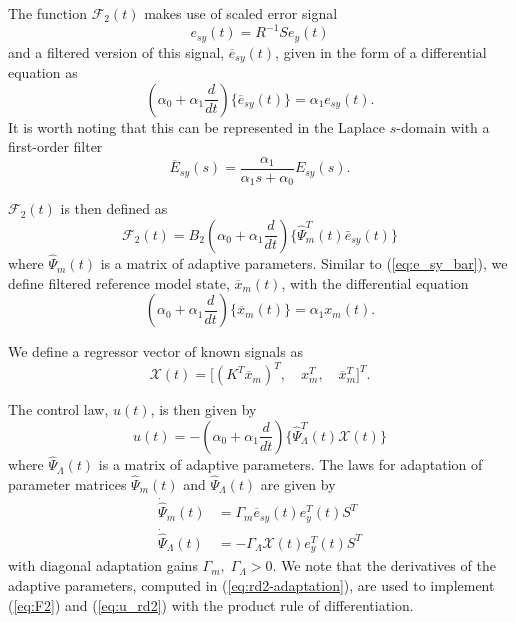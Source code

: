\documentclass[english]{ifacconf}
\begin{document}
The function $\mathcal{F}_2(t)$ makes use of scaled error signal
\begin{equation}
	e_{sy}(t) = R^{-1} S e_y(t) \label{eq:esy}
\end{equation}
and a filtered version of this signal, $\overline{e}_{sy}(t)$, given in the form of a differential equation as
\begin{equation}
(\alpha_0 + \alpha_1 \frac{d}{dt}) \big\{ \overline{e}_{sy}(t) \big\} = \alpha_1 e_{sy}(t). \label{eq:e_sy_bar}
\end{equation}
It is worth noting that this can be represented in the Laplace $s$-domain with a first-order filter
\begin{equation*}
	\overline{E}_{sy}(s) = \frac{\alpha_1}{\alpha_1 s + \alpha_0} E_{sy}(s).
\end{equation*}

$\mathcal{F}_2(t)$ is then defined as
\begin{equation}
\mathcal{F}_2(t) = B_2 (\alpha_0 + \alpha_1 \frac{d}{dt})\big\{ \hat{\Psi}_m^T (t) \bar{e}_{sy}(t) \big\} \label{eq:F2}
\end{equation}
where $\hat{\Psi}_m(t)$ is a matrix of adaptive parameters. Similar to (\ref{eq:e_sy_bar}), we define filtered reference model state, $\overline{x}_m(t)$, with the differential equation
\begin{equation}
(\alpha_0 + \alpha_1 \frac{d}{dt}) \big\{ \overline{x}_{m}(t) \big\} = \alpha_1 x_{m}(t). \label{eq:xm_bar}
\end{equation}

We define a regressor vector of known signals as
\begin{equation}
\mathcal{X}(t) = \big[ (K^T \overline{x}_m)^T,\quad x_m^T,\quad \overline{x}_m^T \big]^T.
\end{equation}

The control law, $u(t)$, is then given by
\begin{equation}
u(t) = - (\alpha_0 + \alpha_1 \frac{d}{dt}) \big \{ \hat{\Psi}_{\Lambda}^T (t) \mathcal{X}(t) \big\} \label{eq:u_rd2}	
\end{equation}
where $\hat{\Psi}_{\Lambda}(t)$ is a matrix of adaptive parameters. The laws for adaptation of parameter matrices $\hat{\Psi}_m(t)$ and $\hat{\Psi}_{\Lambda}(t)$ are given by
\begin{equation}
\begin{aligned}
	\dot{\hat{\Psi}}_m(t) &= \Gamma_{m} \overline{e}_{sy}(t) e_y^T(t) S^T \\
	\dot{\hat{\Psi}}_{\Lambda}(t) &= -\Gamma_{\Lambda} \mathcal{X}(t) e_y^T (t) S^T
\end{aligned} \label{eq:rd2-adaptation}
\end{equation}
with diagonal adaptation gains $\Gamma_{m}, \;\Gamma_{\Lambda} > 0$. We note that the derivatives of the adaptive parameters, computed in (\ref{eq:rd2-adaptation}), are used to implement (\ref{eq:F2}) and (\ref{eq:u_rd2}) with the product rule of differentiation.
\end{document}
